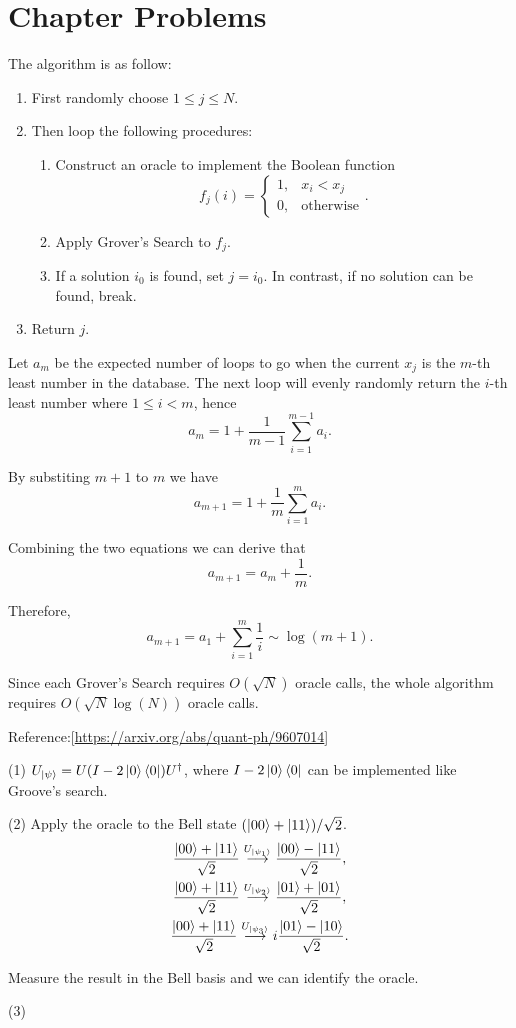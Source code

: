 \section*{Chapter Problems}

\prob The algorithm is as follow:
\begin{enumerate}
    \item First randomly choose $1\le j\le N$.
    \item Then loop the following procedures:
    \begin{enumerate}
        \item Construct an oracle to implement the Boolean function $$f_j(i) = \begin{cases} 1,& x_i < x_j \\ 0,& \text{otherwise} \end{cases}.$$
        \item Apply Grover's Search to $f_j$.
        \item If a solution $i_0$ is found, set $j=i_0$. In contrast, if no solution can be found, break.
    \end{enumerate}
    \item Return $j$.
\end{enumerate}

Let $a_m$ be the expected number of loops to go when the current $x_j$ is the $m$-th least number in the database.
The next loop will evenly randomly return the $i$-th least number where $1\le i<m$, hence
$$a_m=1+\frac{1}{m-1}\sum_{i=1}^{m-1}a_i.$$

By substiting $m+1$ to $m$ we have
$$a_{m+1}=1+\frac{1}{m}\sum_{i=1}^{m}a_i.$$

Combining the two equations we can derive that
$$a_{m+1}=a_m+\frac{1}{m}.$$

Therefore,
$$a_{m+1}=a_1+\sum_{i=1}^m\frac{1}{i}\sim\log(m+1).$$

Since each Grover's Search requires $O(\sqrt{N})$ oracle calls, the whole algorithm requires $O(\sqrt{N}\log(N))$ oracle calls.

Reference:[\url{https://arxiv.org/abs/quant-ph/9607014}]

\prob (1) $U_{\left|\psi\right\rangle} = U(I-2\left|0\right\rangle\left\langle0\right|)U^\dagger$, where $I-2\left|0\right\rangle\left\langle0\right|$ can be implemented like Groove's search.

(2) Apply the oracle to the Bell state $(\left|00\right\rangle + \left|11\right\rangle)/\sqrt{2}$.
$$\begin{gathered}
    \frac{
        \left|00\right\rangle + \left|11\right\rangle
    }{
        \sqrt{2}
    } \overset{
        U_{\left|\psi_1\right\rangle}
    }{
        \longrightarrow
    } \frac{
        \left|00\right\rangle - \left|11\right\rangle
    }{
        \sqrt{2}
    },
    \\
    \frac{
        \left|00\right\rangle + \left|11\right\rangle
    }{
        \sqrt{2}
    } \overset{
        U_{\left|\psi_2\right\rangle}
    }{
        \longrightarrow
    } \frac{
        \left|01\right\rangle + \left|01\right\rangle
    }{
        \sqrt{2}
    },
    \\
    \frac{
        \left|00\right\rangle + \left|11\right\rangle
    }{
        \sqrt{2}
    } \overset{
        U_{\left|\psi_3\right\rangle}
    }{
        \longrightarrow
    } i\frac{
        \left|01\right\rangle - \left|10\right\rangle
    }{
        \sqrt{2}
    }.
\end{gathered}$$

Measure the result in the Bell basis and we can identify the oracle.

(3) \todo

\prob \todo

\prob \todo
